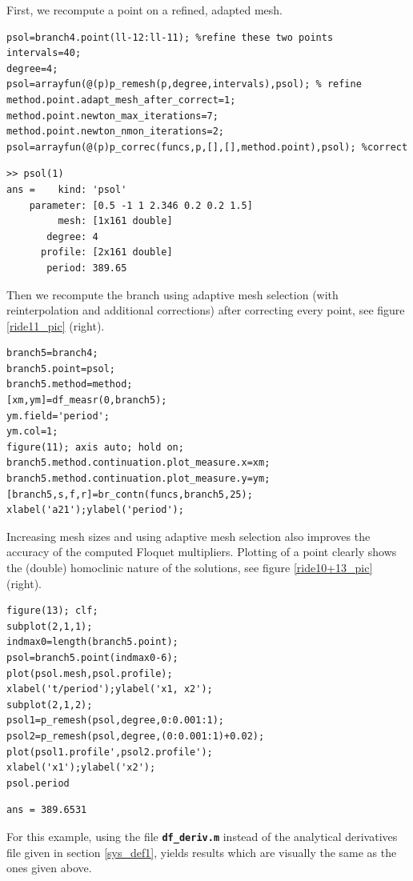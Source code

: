 \documentclass[10pt]{scrartcl}
\newcommand{\file}[1]{\textbf{\texttt{#1}}}
\begin{document}
First, we recompute a point on a refined, adapted mesh.
\begin{lstlisting}
psol=branch4.point(ll-12:ll-11); %refine these two points
intervals=40;
degree=4;
psol=arrayfun(@(p)p_remesh(p,degree,intervals),psol); % refine
method.point.adapt_mesh_after_correct=1;
method.point.newton_max_iterations=7;
method.point.newton_nmon_iterations=2;
psol=arrayfun(@(p)p_correc(funcs,p,[],[],method.point),psol); %correct  
\end{lstlisting}
{
\small
\begin{verbatim}
>> psol(1)
ans =    kind: 'psol'
    parameter: [0.5 -1 1 2.346 0.2 0.2 1.5]
         mesh: [1x161 double]
       degree: 4
      profile: [2x161 double]
       period: 389.65
\end{verbatim}}
Then we recompute the branch using adaptive mesh selection
(with reinterpolation and additional corrections) 
after correcting every point, see figure \ref{ride11_pic} (right).
\begin{lstlisting}
branch5=branch4;
branch5.point=psol;
branch5.method=method;
[xm,ym]=df_measr(0,branch5);
ym.field='period';
ym.col=1;
figure(11); axis auto; hold on;
branch5.method.continuation.plot_measure.x=xm;
branch5.method.continuation.plot_measure.y=ym;
[branch5,s,f,r]=br_contn(funcs,branch5,25);
xlabel('a21');ylabel('period');  
\end{lstlisting}
Increasing mesh sizes and using adaptive mesh selection
also improves the accuracy of the computed Floquet multipliers.
Plotting of a point clearly shows the (double)
homoclinic nature of the solutions, see figure \ref{ride10+13_pic} (right).
\begin{lstlisting}
figure(13); clf;
subplot(2,1,1);
indmax0=length(branch5.point);
psol=branch5.point(indmax0-6);
plot(psol.mesh,psol.profile);
xlabel('t/period');ylabel('x1, x2');
subplot(2,1,2);
psol1=p_remesh(psol,degree,0:0.001:1);
psol2=p_remesh(psol,degree,(0:0.001:1)+0.02);
plot(psol1.profile',psol2.profile');
xlabel('x1');ylabel('x2');
psol.period  
\end{lstlisting}
{\small
\begin{verbatim}
ans = 389.6531
\end{verbatim}}
For this example, using the file \file{df\_deriv.m} instead of the 
analytical derivatives file given in section \ref{sys_def1},
yields results which are visually the same as the ones given
above.
\end{document}
